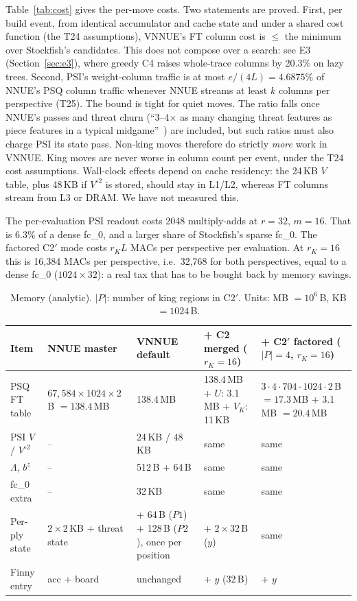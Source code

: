 Table~\ref{tab:cost} gives the per-move costs.
Two statements are proved.
First, per build event, from identical accumulator and cache state and under a shared cost function (the T24 assumptions), VNNUE's FT column cost is $\le$ the minimum over Stockfish's candidates.
This does not compose over a search: see E3 (Section~\ref{sec:e3}), where greedy C4 raises whole-trace columns by 20.3\% on lazy trees.
Second, PSI's weight-column traffic is at most $e/(4L)=4.6875\%$ of NNUE's PSQ column traffic whenever NNUE streams at least $k$ columns per perspective (T25).
The bound is tight for quiet moves.
The ratio falls once NNUE's passes and threat churn (``3--4$\times$ as many changing threat features as piece features in a typical midgame''~\cite{nnuepytorchdocs}) are included, but such ratios must also charge PSI its state pass.
Non-king moves therefore do strictly \emph{more} work in VNNUE.
King moves are never worse in column count per event, under the T24 cost assumptions.
Wall-clock effects depend on cache residency: the 24\,KB $V$ table, plus 48\,KB if $V^{\circ2}$ is stored, should stay in L1/L2, whereas FT columns stream from L3 or DRAM.
We have not measured this.

The per-evaluation PSI readout costs 2048 multiply-adds at $r=32$, $m=16$.
That is 6.3\% of a dense fc\_0, and a larger share of Stockfish's sparse fc\_0.
The factored C2$'$ mode costs $r_KL$ MACs per perspective per evaluation.
At $r_K=16$ this is 16,384 MACs per perspective, i.e.\ 32,768 for both perspectives, equal to a dense fc\_0 ($1024\times32$): a real tax that has to be bought back by memory savings.

\begin{table}[htbp]
\centering\small
\caption{Memory (analytic). $|P|$: number of king regions in C2$'$. Units: MB $=10^6$\,B, KB $=1024$\,B.}\label{tab:memory}
\begin{tabularx}{\linewidth}{@{}>{\raggedright}p{3.0cm}>{\raggedright}p{2.6cm}>{\raggedright}p{2.2cm}>{\raggedright}X>{\raggedright\arraybackslash}X@{}}
\toprule
Item & NNUE master & VNNUE default & + C2 merged ($r_K=16$) & + C2$'$ factored ($|P|=4$, $r_K=16$)\\
\midrule
PSQ FT table & $67{,}584\times1024\times2$\,B $=138.4$\,MB & 138.4\,MB & 138.4\,MB + $U$: 3.1\,MB + $V_K$: 11\,KB & $3\cdot4\cdot704\cdot1024\cdot2$\,B $=17.3$\,MB + 3.1\,MB $=20.4$\,MB\\
PSI $V$ / $V^{\circ2}$ & -- & 24\,KB / 48\,KB & same & same\\
$\Lambda$, $b^z$ & -- & 512\,B + 64\,B & same & same\\
fc\_0 extra & -- & 32\,KB & same & same\\
Per-ply state & $2\times2$\,KB + threat state & + 64\,B ($P1$) + 128\,B ($P2$), once per position & + $2\times32$\,B ($y$) & same\\
Finny entry & acc + board & unchanged & + $y$ (32\,B) & + $y$\\
\bottomrule
\end{tabularx}
\end{table}

